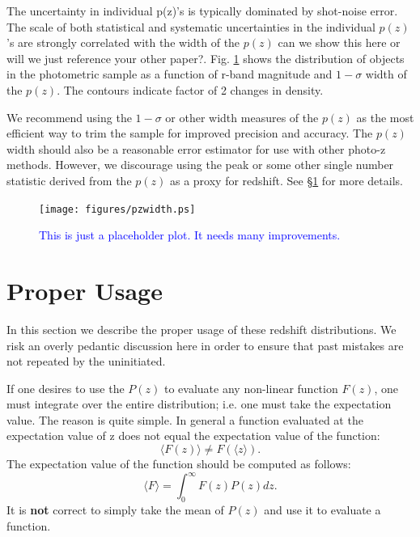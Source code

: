 \documentclass{emulateapj}
\begin{document}
The uncertainty in individual p(z)'s is typically dominated by shot-noise
error.  The scale of both statistical and systematic uncertainties in the
individual $p(z)$'s are strongly correlated with the width of the $p(z)$
{\color{red} can we show this here or will we just reference your other
paper?}.  Fig.  \ref{fig:pzwidth} shows the distribution of objects in the
photometric sample as a function of r-band magnitude and $1-\sigma$ width of
the $p(z)$.  The contours indicate factor of 2 changes in density.  

We recommend using the $1-\sigma$ or other width measures of the $p(z)$ as the
most efficient way to trim the sample for improved precision and accuracy.  The
$p(z)$ width should also be a reasonable error estimator for use with other
photo-z methods.  However, we discourage using the peak or some other single
number statistic derived from the $p(z)$ as a proxy for redshift. See 
\S \ref{sec:usage} for more details.

\begin{figure}[p]\centering
    \texttt{[image: figures/pzwidth.ps]}
    \caption{\textcolor{blue}{This is just a placeholder plot. It needs many improvements.}}
    \label{fig:pzwidth}

    \vspace{2em}
\end{figure}

\section{Proper Usage} \label{sec:usage}

In this section we describe the proper usage of these redshift distributions.
We risk an overly pedantic discussion here in order to ensure that past
mistakes are not repeated by the uninitiated.

If one desires to use the $P(z)$ to evaluate any non-linear function $F(z)$,
one must integrate over the entire distribution; i.e. one must take the
expectation value.  The reason is quite simple. In general a function evaluated
at the expectation value of z does not equal the expectation value of the
function:
\begin{equation}
\langle F(z) \rangle \ne F(\langle z \rangle).
\end{equation}
The expectation value of the function should be computed as follows:
\begin{equation}
\langle F \rangle = \int_{0}^{\infty} F(z) P(z) dz.
\end{equation}
It is {\bf not} correct to simply take the mean of $P(z)$ and use it to evaluate
a function.
\end{document}
